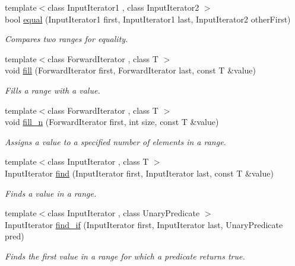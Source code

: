 \begin{DoxyCompactItemize}
{\footnotesize template$<$class Input\+Iterator1 , class Input\+Iterator2 $>$ }\\bool \hyperlink{namespaceprism_ad3bede9a0f2c648e93677b14c45b1b7b}{equal} (Input\+Iterator1 first, Input\+Iterator1 last, Input\+Iterator2 other\+First)
\begin{DoxyCompactList}\small\item\em Compares two ranges for equality. \end{DoxyCompactList}\item 
{\footnotesize template$<$class Forward\+Iterator , class T $>$ }\\void \hyperlink{namespaceprism_a7c33653a5b4a07b31f5bde15e9085b45}{fill} (Forward\+Iterator first, Forward\+Iterator last, const T \&value)
\begin{DoxyCompactList}\small\item\em Fills a range with a value. \end{DoxyCompactList}\item 
{\footnotesize template$<$class Forward\+Iterator , class T $>$ }\\void \hyperlink{namespaceprism_aceb4b9c511a5edb706296b457427b226}{fill\+\_\+n} (Forward\+Iterator first, int size, const T \&value)
\begin{DoxyCompactList}\small\item\em Assigns a value to a specified number of elements in a range. \end{DoxyCompactList}\item 
{\footnotesize template$<$class Input\+Iterator , class T $>$ }\\Input\+Iterator \hyperlink{namespaceprism_a1b543d9c2862a539cc8b770abda87561}{find} (Input\+Iterator first, Input\+Iterator last, const T \&value)
\begin{DoxyCompactList}\small\item\em Finds a value in a range. \end{DoxyCompactList}\item 
{\footnotesize template$<$class Input\+Iterator , class Unary\+Predicate $>$ }\\Input\+Iterator \hyperlink{namespaceprism_a411641547f43e750a186c89bf0dd5a59}{find\+\_\+if} (Input\+Iterator first, Input\+Iterator last, Unary\+Predicate pred)
\begin{DoxyCompactList}\small\item\em Finds the first value in a range for which a predicate returns true. \end{DoxyCompactList}\item 

\end{DoxyCompactItemize}
